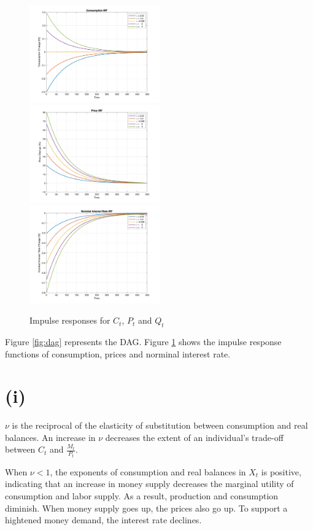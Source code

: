 \documentclass[12pt]{article}
\begin{document}
\begin{figure}[ht]
    \centering
    \includegraphics[width=0.5\textwidth]{figs/irf_c.png}
    \includegraphics[width=0.5\textwidth]{figs/irf_p.png}
    \includegraphics[width=0.5\textwidth]{figs/irf_q.png}
    \caption{Impulse responses for $C_t$, $P_t$ and $Q_t$}
    \label{fig:irf}
\end{figure}

Figure \ref{fig:dag} represents the DAG. 
Figure \ref{fig:irf} shows the impulse response functions of consumption, 
prices and norminal interest rate.

\section*{(i)}

$\nu$ is the reciprocal of the elasticity of substitution between consumption
and real balances. 
An increase in $\nu$ decreases the extent of an individual's trade-off between $C_t$ and $\frac{M_{t}}{P_{t}}$. 

When $\nu < 1$, the exponents of consumption and real balances in $X_{t}$ is positive, 
indicating that an increase in money supply decreases the marginal utility of consumption and labor supply. 
As a result, production and consumption diminish. 
When money supply goes up, the prices also go up. 
To support a hightened money demand, the interest rate declines. 
\end{document}

